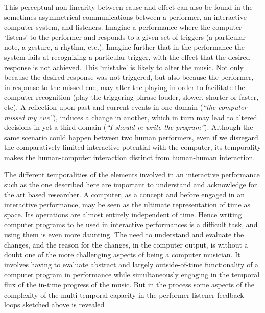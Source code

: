 This perceptual non-linearity between cause and effect can also be found in the sometimes asymmetrical communications between a performer, an interactive computer system, and listeners. Imagine a performance where the computer `listens' to the performer and responds to a given set of triggers (a particular note, a gesture, a rhythm, etc.). Imagine further that in the performance the system fails at recognizing a particular trigger, with the effect that the desired response is not achieved. This `mistake' is likely to alter the music. Not only because the desired response was not triggered, but also because the performer, in response to the missed cue, may alter the playing in order to facilitate the computer recognition (play the triggering phrase louder, slower, shorter or faster, etc). A reflection upon past and current events in one domain (\emph{``the computer missed my cue''}), induces a change in another, which in turn may lead to altered decisions in yet a third domain (\emph{``I should re-write the program''}). Although the same scenario could happen between two human performers, even if we disregard the comparatively limited interactive potential with the computer, its temporality makes the human-computer interaction distinct from human-human interaction. 

The different temporalities of the elements involved in an interactive performance such as the one described here are important to understand and acknowledge for the art based researcher. A computer, as a concept and before engaged in an interactive performance, may be seen as the ultimate representation of time as space. Its operations are almost entirely independent of time. Hence writing computer programs to be used in interactive performances is a difficult task, and using them is even more daunting. The need to understand and evaluate the changes, and the reason for the changes, in the computer output, is without a doubt one of the more challenging aspects of being a computer musician. It involves having to evaluate abstract and largely outside-of-time functionality of a computer program in performance while simultaneously engaging in the temporal flux of the in-time progress of the music. But in the process some aspects of the complexity of the multi-temporal capacity in the performer-listener feedback loops sketched above is revealed

